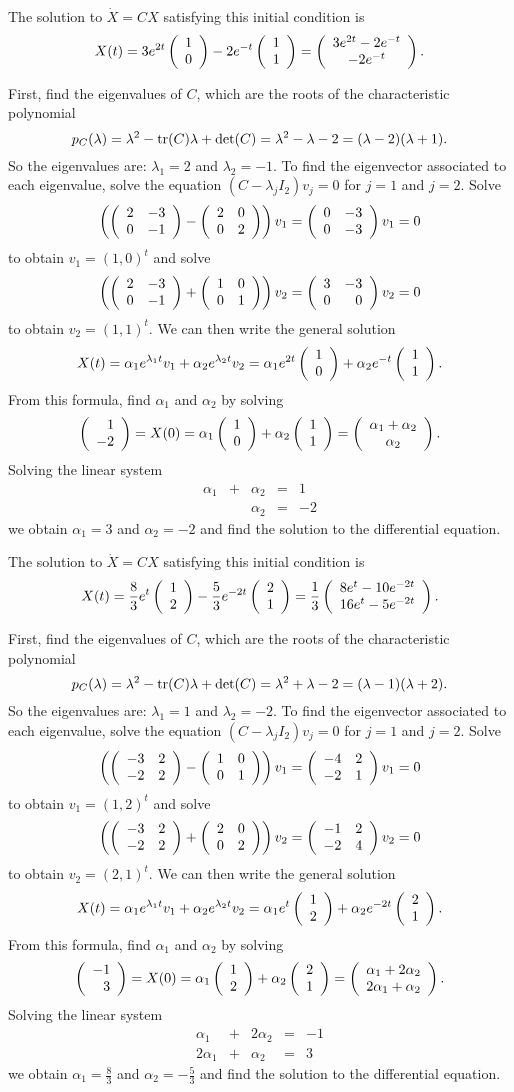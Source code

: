  \ans The solution to $\dot{X} = CX$ satisfying this
initial condition is
\[
X(t) = 3e^{2t}\left(\begin{array}{r} 1 \\ 0\end{array}\right) - 2e^{-t}\left(\begin{array}{r} 1 \\ 1\end{array}\right)
= \left(\begin{array}{c} 3e^{2t} - 2e^{-t} \\ -2e^{-t}\end{array}\right).
\]

\soln First, find the eigenvalues of $C$, which are the roots of the
characteristic polynomial
\[
p_C(\lambda) = \lambda^2 - {\rm tr}(C)\lambda + \det(C) =
\lambda^2 - \lambda - 2 = (\lambda - 2)(\lambda + 1).
\]
So the eigenvalues are: $\lambda_1 = 2$ and $\lambda_2 = -1$.
To find the eigenvector associated to each eigenvalue, solve
the equation $(C - \lambda_jI_2)v_j = 0$ for $j = 1$ and $j = 2$.  Solve
\[
\left(\left(\begin{array}{rr} 2 & -3\\ 0 &-1\end{array}\right) - \left(\begin{array}{rr} 2 & 0\\ 0 &2\end{array}\right)\right)v_1 =
\left(\begin{array}{rr} 0 & -3\\ 0 &-3\end{array}\right)v_1 = 0
\]
to obtain $v_1 = (1,0)^t$ and solve
\[
\left(\left(\begin{array}{rr} 2 & -3\\ 0 &-1\end{array}\right) + \left(\begin{array}{rr} 1 & 0\\ 0 &1\end{array}\right)\right)v_2 =
\left(\begin{array}{rr} 3 & -3\\ 0 &0\end{array}\right)v_2 = 0
\]
to obtain $v_2 = (1,1)^t$.  We can then write the general solution
\[
X(t) = \alpha_1e^{\lambda_1 t}v_1 + \alpha_2e^{\lambda_2 t}v_2
= \alpha_1e^{2t}\left(\begin{array}{r} 1 \\ 0\end{array}\right) + \alpha_2e^{-t}\left(\begin{array}{r} 1 \\ 1\end{array}\right).
\]
From this formula, find $\alpha_1$ and $\alpha_2$ by solving
\[
\left(\begin{array}{r} 1 \\ -2\end{array}\right) = X(0) = \alpha_1\left(\begin{array}{r} 1 \\ 0\end{array}\right) + \alpha_2\left(\begin{array}{r} 1 \\ 1\end{array}\right) =
\left(\begin{array}{c} \alpha_1 + \alpha_2 \\ \alpha_2\end{array}\right).
\]
Solving the linear system
\[
\begin{array}{rrrrr}
\alpha_1 & + & \alpha_2 & = & 1 \\
& & \alpha_2 & = & -2
\end{array}
\]
we obtain $\alpha_1 = 3$ and $\alpha_2 = -2$ and find the
solution to the differential equation.


 \ans The solution to $\dot{X} = CX$ satisfying this
initial condition is
\[
X(t) = \frac{8}{3}e^t\left(\begin{array}{r} 1 \\ 2\end{array}\right) - \frac{5}{3}e^{-2t}\left(\begin{array}{r} 2 \\ 1\end{array}\right)
= \frac{1}{3}\left(\begin{array}{c} 8e^t - 10e^{-2t} \\ 16e^t - 5e^{-2t}\end{array}\right).
\]

\soln First, find the eigenvalues of $C$, which are the roots of the
characteristic polynomial
\[
p_C(\lambda) = \lambda^2 - {\rm tr}(C)\lambda + \det(C) =
\lambda^2 + \lambda - 2 = (\lambda - 1)(\lambda + 2).
\]
So the eigenvalues are: $\lambda_1 = 1$ and $\lambda_2 = -2$.
To find the eigenvector associated to each eigenvalue, solve
the equation $(C - \lambda_jI_2)v_j = 0$ for $j = 1$ and $j = 2$.  Solve
\[
\left(\left(\begin{array}{rr} -3 & 2\\ -2 &2\end{array}\right) - \left(\begin{array}{rr} 1 & 0\\ 0 &1\end{array}\right)\right)v_1 =
\left(\begin{array}{rr} -4 & 2\\ -2 &1\end{array}\right)v_1 = 0
\]
to obtain $v_1 = (1,2)^t$ and solve
\[
\left(\left(\begin{array}{rr} -3 & 2\\ -2 &2\end{array}\right) + \left(\begin{array}{rr} 2 & 0\\ 0 &2\end{array}\right)\right)v_2 =
\left(\begin{array}{rr} -1 & 2\\ -2 &4\end{array}\right)v_2 = 0
\]
to obtain $v_2 = (2,1)^t$.  We can then write the general solution
\[
X(t) = \alpha_1e^{\lambda_1 t}v_1 + \alpha_2e^{\lambda_2 t}v_2
= \alpha_1e^t\left(\begin{array}{r} 1 \\ 2\end{array}\right) + \alpha_2e^{-2t}\left(\begin{array}{r} 2 \\ 1\end{array}\right).
\]
From this formula, find $\alpha_1$ and $\alpha_2$ by solving
\[
\left(\begin{array}{r} -1 \\ 3\end{array}\right) = X(0) = \alpha_1\left(\begin{array}{r} 1 \\ 2\end{array}\right) + \alpha_2\left(\begin{array}{r} 2 \\ 1\end{array}\right) =
\left(\begin{array}{c} \alpha_1 + 2\alpha_2 \\ 2\alpha_1 + \alpha_2\end{array}\right).
\]
Solving the linear system
\[
\begin{array}{rrrrr}
\alpha_1 & + & 2\alpha_2 & = & -1 \\
2\alpha_1 & + & \alpha_2 & = & 3
\end{array}
\]
we obtain $\alpha_1 = \frac{8}{3}$ and $\alpha_2 = -\frac{5}{3}$
and find the solution to the differential equation.

